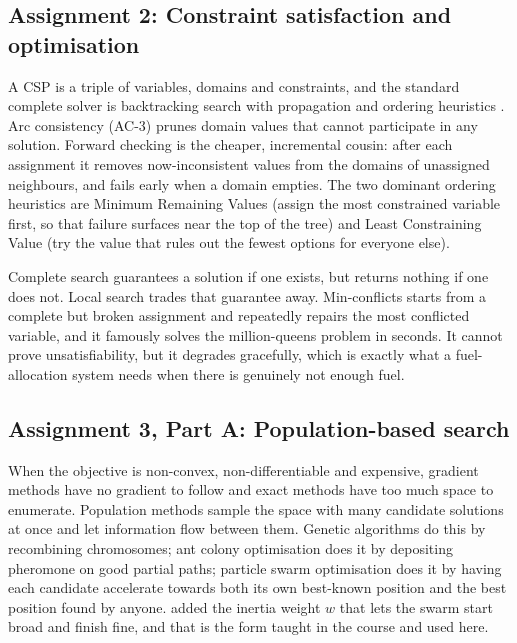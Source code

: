 \documentclass{ai-lab-report}
\begin{document}
\subsection{Assignment 2: Constraint satisfaction and optimisation}
A CSP is a triple of variables, domains and constraints, and the standard complete solver
is backtracking search with propagation and ordering heuristics
\citep{russell2021ai}. Arc consistency (AC-3) \citep{mackworth1977consistency} prunes
domain values that cannot participate in any solution. Forward checking
\citep{haralick1980increasing} is the cheaper, incremental cousin: after each assignment
it removes now-inconsistent values from the domains of unassigned neighbours, and fails
early when a domain empties. The two dominant ordering heuristics are Minimum Remaining
Values (assign the most constrained variable first, so that failure surfaces near the top
of the tree) and Least Constraining Value (try the value that rules out the fewest options
for everyone else).

Complete search guarantees a solution if one exists, but returns nothing if one does not.
Local search trades that guarantee away. Min-conflicts \citep{minton1992minconflicts}
starts from a complete but broken assignment and repeatedly repairs the most conflicted
variable, and it famously solves the million-queens problem in seconds. It cannot prove
unsatisfiability, but it degrades gracefully, which is exactly what a fuel-allocation
system needs when there is genuinely not enough fuel.

\subsection{Assignment 3, Part A: Population-based search}
When the objective is non-convex, non-differentiable and expensive, gradient methods have
no gradient to follow and exact methods have too much space to enumerate. Population
methods sample the space with many candidate solutions at once and let information flow
between them. Genetic algorithms \citep{holland1975adaptation, goldberg1989ga} do this by
recombining chromosomes; ant colony optimisation \citep{dorigo1996antsystem} does it by
depositing pheromone on good partial paths; particle swarm optimisation
\citep{kennedy1995pso} does it by having each candidate accelerate towards both its own
best-known position and the best position found by anyone. \citet{shi1998inertia} added the
inertia weight $w$ that lets the swarm start broad and finish fine, and that is the form
taught in the course and used here.
\end{document}
